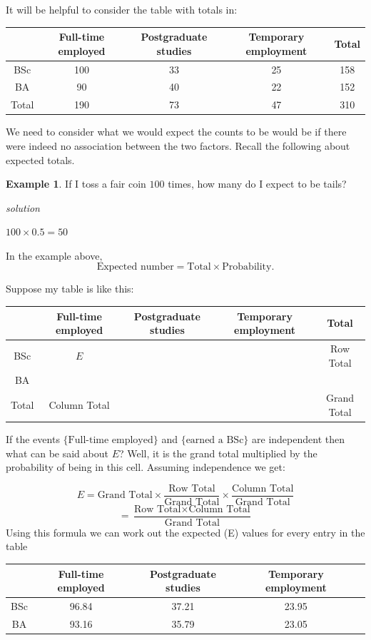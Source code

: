 \documentclass[
]{book}
\theoremstyle{definition}
\theoremstyle{definition}
\newtheorem{example}{Example}[chapter]
\theoremstyle{definition}
\theoremstyle{definition}
\theoremstyle{remark}
\begin{document}
It will be helpful to consider the table with totals in:

\begin{longtable}[]{@{}ccccc@{}}
\toprule
& Full-time employed & Postgraduate studies & Temporary employment & Total\tabularnewline
\midrule
\endhead
BSc & 100 & 33 & 25 & 158\tabularnewline
BA & 90 & 40 & 22 & 152\tabularnewline
Total & 190 & 73 & 47 & 310\tabularnewline
\bottomrule
\end{longtable}

We need to consider what we would expect the counts to be would be if there were indeed no association between the two factors. Recall the following about expected totals.

\begin{example}
If I toss a fair coin \(100\) times, how many do I expect to be tails?

\emph{solution}

\(100 \times 0.5=50\)
\end{example}

In the example above,
\[\text{Expected number} = \text{Total} \times \text{Probability}.\]

Suppose my table is like this:

\begin{longtable}[]{@{}ccccc@{}}
\toprule
& Full-time employed & Postgraduate studies & Temporary employment & Total\tabularnewline
\midrule
\endhead
BSc & \(E\) & & & Row Total\tabularnewline
BA & & & &\tabularnewline
Total & Column Total & & & Grand Total\tabularnewline
\bottomrule
\end{longtable}

If the events \(\{\text{Full-time employed}\}\) and \(\{\text{earned a BSc} \}\) are independent then what can be said about \(E\)? Well, it is the grand total multiplied by the probability of being in this cell. Assuming independence we get:

\[E = \text{Grand Total} \times \frac{\text{Row Total}}{\text{Grand Total}}\times \frac{\text{Column Total}}{\text{Grand Total}}\]
\[= \frac{\text{Row Total}\times\text{Column Total}}{\text{Grand Total}}\]
Using this formula we can work out the expected (E) values for every entry in the table

\begin{longtable}[]{@{}ccccc@{}}
\toprule
& Full-time employed & Postgraduate studies & Temporary employment &\tabularnewline
\midrule
\endhead
BSc & 96.84 & 37.21 & 23.95 &\tabularnewline
BA & 93.16 & 35.79 & 23.05 &\tabularnewline
\bottomrule
\end{longtable}
\end{document}
